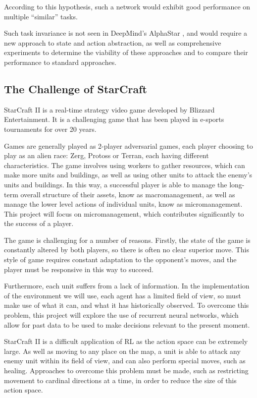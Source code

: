 According to this hypothesis, such a network would exhibit good performance on multiple ``similar'' tasks.

Such task invariance is not seen in DeepMind's AlphaStar \cite{alphastar}, and would require a new approach to state and action abstraction, as well as comprehensive experiments to determine the viability of these approaches and to compare their performance to standard approaches.


\subsection{The Challenge of StarCraft}

StarCraft II is a real-time strategy video game developed by Blizzard Entertainment. It is a challenging game that has been played in e-sports tournaments for over 20 years.

Games are generally played as 2-player adversarial games, each player choosing to play as an alien race: Zerg, Protoss or Terran, each having different characteristics. The game involves using workers to gather resources, which can make more units and buildings, as well as using other units to attack the enemy's units and buildings. In this way, a successful player is able to manage the long-term overall structure of their assets, know as macromanagement, as well as manage the lower level actions of individual units, know as micromanagement. This project will focus on micromanagement, which contributes significantly to the success of a player.

The game is challenging for a number of reasons. Firstly, the state of the game is constantly altered by both players, so there is often no clear superior move. This style of game requires constant adaptation to the opponent's moves, and the player must be responsive in this way to succeed. 

Furthermore, each unit suffers from a lack of information. In the implementation of the environment we will use, each agent has a limited field of view, so must make use of what it can, and what it has historically observed. To overcome this problem, this project will explore the use of recurrent neural networks, which allow for past data to be used to make decisions relevant to the present moment.

StarCraft II is a difficult application of RL as the action space can be extremely large. As well as moving to any place on the map, a unit is able to attack any enemy unit within its field of view, and can also perform special moves, such as healing. Approaches to overcome this problem must be made, such as restricting movement to cardinal directions at a time, in order to reduce the size of this action space. 

